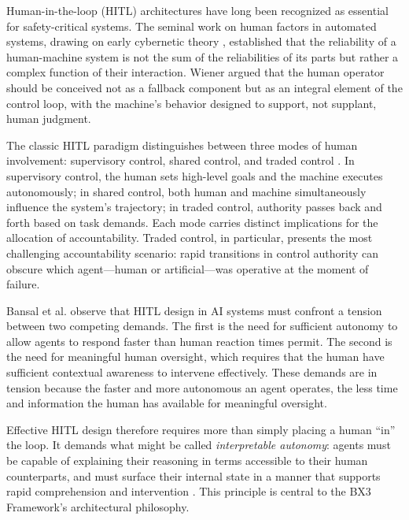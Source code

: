 
Human-in-the-loop (HITL) architectures have long been recognized as essential for safety-critical systems. The seminal work on human factors in automated systems, drawing on early cybernetic theory \cite{wiener1948}, established that the reliability of a human-machine system is not the sum of the reliabilities of its parts but rather a complex function of their interaction. Wiener argued that the human operator should be conceived not as a fallback component but as an integral element of the control loop, with the machine's behavior designed to support, not supplant, human judgment.

The classic HITL paradigm distinguishes between three modes of human involvement: supervisory control, shared control, and traded control \cite{tristr81}. In supervisory control, the human sets high-level goals and the machine executes autonomously; in shared control, both human and machine simultaneously influence the system's trajectory; in traded control, authority passes back and forth based on task demands. Each mode carries distinct implications for the allocation of accountability. Traded control, in particular, presents the most challenging accountability scenario: rapid transitions in control authority can obscure which agent---human or artificial---was operative at the moment of failure.

Bansal et al. \cite{bansal2019} observe that HITL design in AI systems must confront a tension between two competing demands. The first is the need for sufficient autonomy to allow agents to respond faster than human reaction times permit. The second is the need for meaningful human oversight, which requires that the human have sufficient contextual awareness to intervene effectively. These demands are in tension because the faster and more autonomous an agent operates, the less time and information the human has available for meaningful oversight.

Effective HITL design therefore requires more than simply placing a human ``in'' the loop. It demands what might be called \textit{interpretable autonomy}: agents must be capable of explaining their reasoning in terms accessible to their human counterparts, and must surface their internal state in a manner that supports rapid comprehension and intervention \cite{dijkstra1982}. This principle is central to the BX3 Framework's architectural philosophy.


